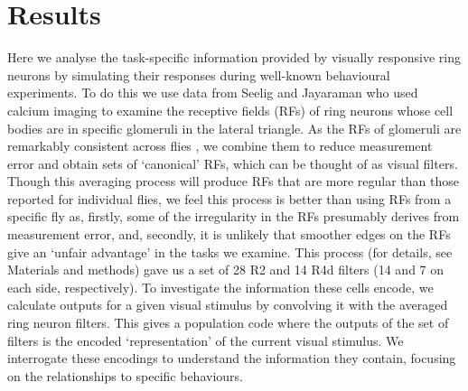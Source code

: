 \section*{Results}
Here we analyse the task-specific information provided by visually responsive ring neurons by simulating their responses during well-known behavioural experiments. To do this we use data from Seelig and Jayaraman \cite{Seelig2013} who used calcium imaging to examine the receptive fields (RFs) of ring neurons whose cell bodies are in specific glomeruli in the lateral triangle. As the RFs of glomeruli are remarkably consistent across flies \cite{Seelig2013}, we combine them to reduce measurement error and obtain sets of ‘canonical’ RFs, which can be thought of as visual filters. Though this averaging process will produce RFs that are more regular than those reported for individual flies, we feel this process is better than using RFs from a specific fly as, firstly, some of the irregularity in the RFs presumably derives from measurement error, and, secondly, it is unlikely that smoother edges on the RFs give an ‘unfair advantage’ in the tasks we examine. This process (for details, see Materials and methods) gave us a set of 28 R2 and 14 R4d filters (14 and 7 on each side, respectively). To investigate the information these cells encode, we calculate outputs for a given visual stimulus by convolving it with the averaged ring neuron filters. This gives a population code where the outputs of the set of filters is the encoded ‘representation’ of the current visual stimulus. We interrogate these encodings to understand the information they contain, focusing on the relationships to specific behaviours.

